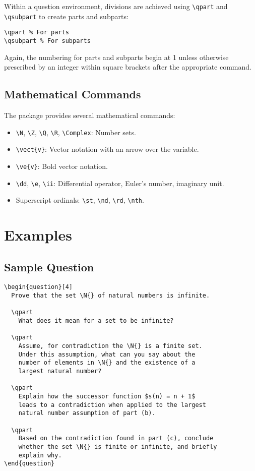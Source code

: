 \documentclass[a4paper,11pt,twoside]{article}
\begin{document}
Within a question environment, divisions are achieved using \verb|\qpart| and \verb|\qsubpart| to create parts and subparts:

\begin{verbatim}
\qpart % For parts
\qsubpart % For subparts
\end{verbatim}

Again, the numbering for parts and subparts begin at 1 unless otherwise prescribed by an integer within square brackets after the appropriate command.

\subsection{Mathematical Commands}

The package provides several mathematical commands:

\begin{itemize}
\item \verb|\N|, \verb|\Z|, \verb|\Q|, \verb|\R|, \verb|\Complex|: Number sets.
\item \verb|\vect{v}|: Vector notation with an arrow over the variable.
\item \verb|\ve{v}|: Bold vector notation.
\item \verb|\dd|, \verb|\e|, \verb|\ii|: Differential operator, Euler's number, imaginary unit.
\item Superscript ordinals: \verb|\st|, \verb|\nd|, \verb|\rd|, \verb|\nth|.
\end{itemize}

\section{Examples}

\subsection{Sample Question}

\begin{verbatim}
\begin{question}[4]
  Prove that the set \N{} of natural numbers is infinite.

  \qpart
    What does it mean for a set to be infinite?

  \qpart
    Assume, for contradiction the \N{} is a finite set.
    Under this assumption, what can you say about the
    number of elements in \N{} and the existence of a
    largest natural number?

  \qpart
    Explain how the successor function $s(n) = n + 1$
    leads to a contradiction when applied to the largest
    natural number assumption of part (b).

  \qpart
    Based on the contradiction found in part (c), conclude
    whether the set \N{} is finite or infinite, and briefly
    explain why.
\end{question}
\end{verbatim}
\end{document}
